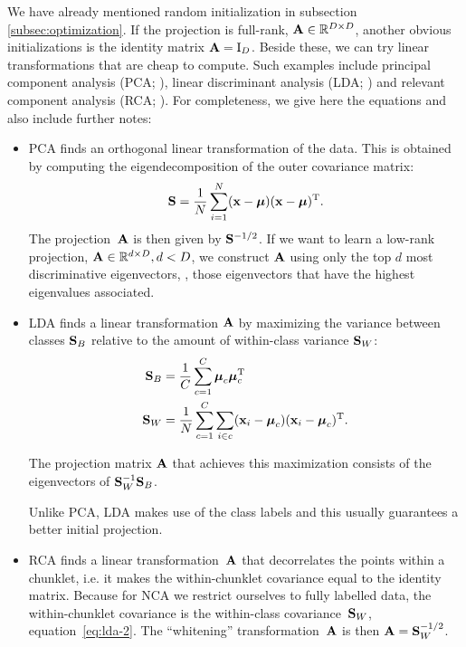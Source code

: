     We have already mentioned random initialization in subsection \ref{subsec:optimization}. If the projection is full-rank, $\mathbf{A}\in\mathbb{R}^{D\times D}$, another obvious initializations is the identity matrix $\mathbf{A}=\mathrm{I}_D$. Beside these, we can try linear transformations that are cheap to compute. Such examples include  principal component analysis (PCA; \citealp{pearson1901}), linear discriminant analysis (LDA; \citealp{fisher1936}) and relevant component analysis (RCA; \citealp{bar2003}). For completeness, we give here the equations and also include further notes:
        \begin{itemize}
            \item  PCA finds an orthogonal linear
                transformation of the data. This is
                obtained by computing the
                eigendecomposition of the outer covariance
                matrix:
                \begin{align}
                    \mathbf{S} = \frac{1}{N}\sum_{i=1}^N (\mathbf{x}-\mbox{\boldmath $\mu$})(\mathbf{x}-\mbox{\boldmath $\mu$})^\textrm{T}.
                    \label{eq:pca-1}
                \end{align}
                The projection~$\mathbf{A}$ is then given by $\mathbf{S}^{-1/2}$. If we want to learn a low-rank projection, $\mathbf{A} \in \mathbb{R}^{d\times D},d<D$, we construct $\mathbf{A}$ using only the top $d$ most
        discriminative eigenvectors, \ie, those eigenvectors that have the
        highest eigenvalues associated. 

            \item LDA finds a linear transformation $\mathbf{A}$ by maximizing the
variance between classes $\mathbf{S}_B$ relative to the amount of within-class variance
$\mathbf{S}_W$:
            \begin{align}
             \mathbf{S}_B &=
\frac{1}{C}\sum_{c=1}^{C}\boldsymbol\mu_c\boldsymbol\mu_c^\textrm{T}\label{eq:lda-1}\\
             \mathbf{S}_W &= \frac{1}{N}\sum_{c=1}^{C}\sum_{i \in
c}(\mathbf{x}_i-\boldsymbol{\mbox{\boldmath $\mu$}}_c)(\mathbf{x}_i-\boldsymbol{\mu}_c)^\textrm{T}.\label{eq:lda-2}
            \end{align}

            The projection matrix $\mathbf{A}$ that achieves this maximization consists
of the eigenvectors of $\mathbf{S}_W^{-1}\mathbf{S}_B$.

            Unlike PCA, LDA makes use of the class labels and this
usually guarantees a better initial projection.

            \item RCA finds a linear transformation~$\mathbf{A}$
                that decorrelates the points within a chunklet, i.e. it makes the within-chunklet covariance equal to the identity matrix.
                Because for NCA we restrict ourselves to
                fully labelled data, the within-chunklet
                covariance is the within-class covariance~$\mathbf{S}_W$, equation~\eqref{eq:lda-2}. The
                ``whitening'' transformation~$\mathbf{A}$ is then
                $\mathbf{A}=\mathbf{S}_W^{-1/2}$.
        \end{itemize}

